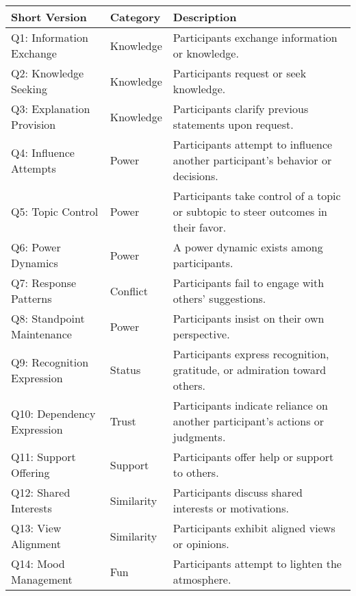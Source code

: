 \begin{table*}[ht]
  \centering
  \scriptsize %
  \begin{tabular}{lll}
    \toprule
    \rowcolor{gray!20}
    \textbf{Short Version} & \textbf{Category} & \textbf{Description} \\
    \midrule
    Q1: Information Exchange    & \cellcolor{pastelBlue}Knowledge  & Participants exchange information or knowledge. \\
    Q2: Knowledge Seeking       & \cellcolor{pastelBlue}Knowledge  & Participants request or seek knowledge. \\
    Q3: Explanation Provision   & \cellcolor{pastelBlue}Knowledge  & Participants clarify previous statements upon request. \\
    Q4: Influence Attempts      & \cellcolor{pastelRed}Power        & Participants attempt to influence another participant’s behavior or decisions. \\
    Q5: Topic Control           & \cellcolor{pastelRed}Power        & Participants take control of a topic or subtopic to steer outcomes in their favor. \\
    Q6: Power Dynamics          & \cellcolor{pastelRed}Power        & A power dynamic exists among participants. \\
    Q7: Response Patterns       & \cellcolor{pastelOrange}Conflict  & Participants fail to engage with others’ suggestions. \\
    Q8: Standpoint Maintenance  & \cellcolor{pastelRed}Power        & Participants insist on their own perspective. \\
    Q9: Recognition Expression  & \cellcolor{pastelGreen}Status     & Participants express recognition, gratitude, or admiration toward others. \\
    Q10: Dependency Expression  & \cellcolor{pastelViolet}Trust     & Participants indicate reliance on another participant’s actions or judgments. \\
    Q11: Support Offering       & \cellcolor{pastelYellow}Support   & Participants offer help or support to others. \\
    Q12: Shared Interests       & \cellcolor{pastelPurple}Similarity& Participants discuss shared interests or motivations. \\
    Q13: View Alignment         & \cellcolor{pastelPurple}Similarity& Participants exhibit aligned views or opinions. \\
    Q14: Mood Management        & \cellcolor{pastelPink}Fun         & Participants attempt to lighten the atmosphere. \\

\end{tabular}
\end{table*}
